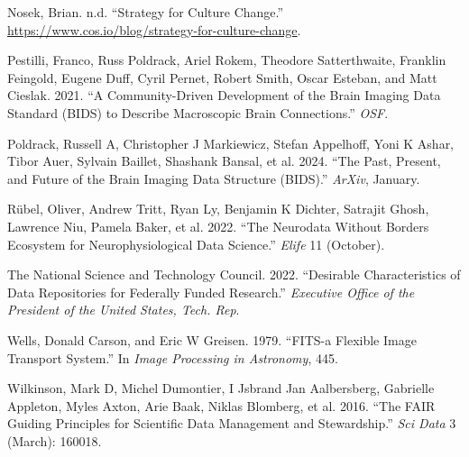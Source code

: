 \documentclass[
  letterpaper,
  DIV=11,
  numbers=noendperiod]{scrartcl}
\newlength{\cslhangindent}
\newenvironment{CSLReferences}[2] %
 {\begin{list}{}{%
  \setlength{\itemindent}{0pt}
  \setlength{\leftmargin}{0pt}
  \setlength{\parsep}{0pt}
  \ifodd #1
   \setlength{\leftmargin}{\cslhangindent}
   \setlength{\itemindent}{-1\cslhangindent}
  \fi
  \setlength{\itemsep}{#2\baselineskip}}}
 {\end{list}}
\begin{document}
\begin{CSLReferences}{1}{0}
Nosek, Brian. n.d. {``Strategy for Culture Change.''}
\url{https://www.cos.io/blog/strategy-for-culture-change}.

Pestilli, Franco, Russ Poldrack, Ariel Rokem, Theodore Satterthwaite,
Franklin Feingold, Eugene Duff, Cyril Pernet, Robert Smith, Oscar
Esteban, and Matt Cieslak. 2021. {``A Community-Driven Development of
the Brain Imaging Data Standard (BIDS) to Describe Macroscopic Brain
Connections.''} \emph{OSF}.

Poldrack, Russell A, Christopher J Markiewicz, Stefan Appelhoff, Yoni K
Ashar, Tibor Auer, Sylvain Baillet, Shashank Bansal, et al. 2024. {``The
Past, Present, and Future of the Brain Imaging Data Structure
({BIDS}).''} \emph{ArXiv}, January.

Rübel, Oliver, Andrew Tritt, Ryan Ly, Benjamin K Dichter, Satrajit
Ghosh, Lawrence Niu, Pamela Baker, et al. 2022. {``The Neurodata Without
Borders Ecosystem for Neurophysiological Data Science.''} \emph{Elife}
11 (October).

The National Science and Technology Council. 2022. {``Desirable
Characteristics of Data Repositories for Federally Funded Research.''}
\emph{Executive Office of the President of the United States, Tech.
Rep}.

Wells, Donald Carson, and Eric W Greisen. 1979. {``FITS-a Flexible Image
Transport System.''} In \emph{Image Processing in Astronomy}, 445.

Wilkinson, Mark D, Michel Dumontier, I Jsbrand Jan Aalbersberg,
Gabrielle Appleton, Myles Axton, Arie Baak, Niklas Blomberg, et al.
2016. {``The {FAIR} Guiding Principles for Scientific Data Management
and Stewardship.''} \emph{Sci Data} 3 (March): 160018.

\end{CSLReferences}
\end{document}
